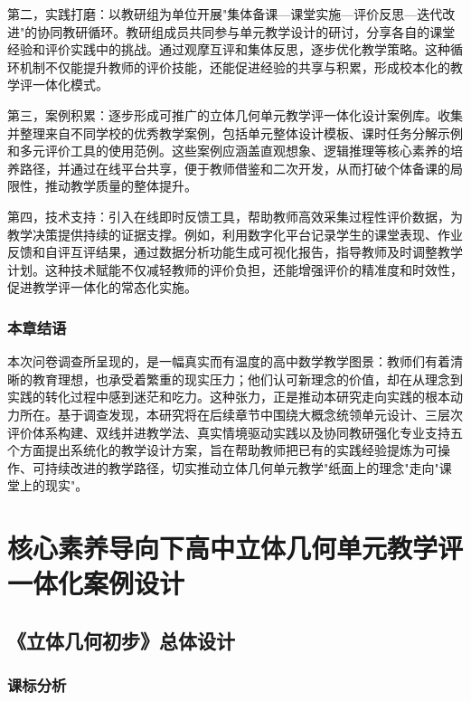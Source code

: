 \documentclass[UTF8,a4paper,12pt,twoside]{ctexart}
\begin{document}
\begin{enumerate}
第二，实践打磨：以教研组为单位开展"集体备课—课堂实施—评价反思—迭代改进"的协同教研循环。教研组成员共同参与单元教学设计的研讨，分享各自的课堂经验和评价实践中的挑战。通过观摩互评和集体反思，逐步优化教学策略。这种循环机制不仅能提升教师的评价技能，还能促进经验的共享与积累，形成校本化的教学评一体化模式。

第三，案例积累：逐步形成可推广的立体几何单元教学评一体化设计案例库。收集并整理来自不同学校的优秀教学案例，包括单元整体设计模板、课时任务分解示例和多元评价工具的使用范例。这些案例应涵盖直观想象、逻辑推理等核心素养的培养路径，并通过在线平台共享，便于教师借鉴和二次开发，从而打破个体备课的局限性，推动教学质量的整体提升。

第四，技术支持：引入在线即时反馈工具，帮助教师高效采集过程性评价数据，为教学决策提供持续的证据支撑。例如，利用数字化平台记录学生的课堂表现、作业反馈和自评互评结果，通过数据分析功能生成可视化报告，指导教师及时调整教学计划。这种技术赋能不仅减轻教师的评价负担，还能增强评价的精准度和时效性，促进教学评一体化的常态化实施。

\end{enumerate}

\subsubsection{本章结语}

本次问卷调查所呈现的，是一幅真实而有温度的高中数学教学图景：教师们有着清晰的教育理想，也承受着繁重的现实压力；他们认可新理念的价值，却在从理念到实践的转化过程中感到迷茫和吃力。这种张力，正是推动本研究走向实践的根本动力所在。基于调查发现，本研究将在后续章节中围绕大概念统领单元设计、三层次评价体系构建、双线并进教学法、真实情境驱动实践以及协同教研强化专业支持五个方面提出系统化的教学设计方案，旨在帮助教师把已有的实践经验提炼为可操作、可持续改进的教学路径，切实推动立体几何单元教学"纸面上的理念"走向"课堂上的现实"。

\section{核心素养导向下高中立体几何单元教学评一体化案例设计}



\subsection{《立体几何初步》总体设计}

\subsubsection{课标分析}
\end{document}
